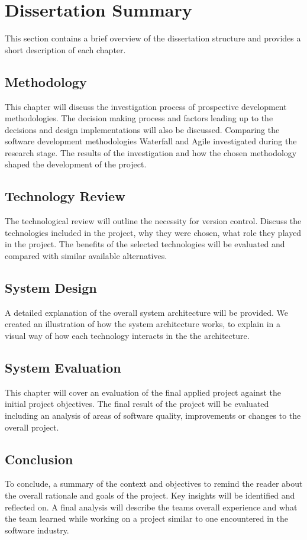 \section{Dissertation Summary}
This section contains a brief overview of the dissertation structure and provides a short description of each chapter.

\subsection{Methodology}
This chapter will discuss the investigation process of prospective development methodologies. The decision making process and factors leading up to the decisions and design implementations will also be discussed. Comparing the software development methodologies  Waterfall and Agile investigated during the research stage. The results of the investigation and how the chosen methodology shaped the development of the project. 

\subsection{Technology Review}
The technological review will outline the necessity for version control. Discuss the technologies included in the project, why they were chosen, what role they played in the project. The benefits of the selected technologies will be evaluated and compared with similar available alternatives.

\subsection{System Design}
A detailed explanation of the overall system architecture will be provided. We created an illustration of how the system architecture works, to explain in a visual way of how each technology interacts in the the architecture.

\subsection{System Evaluation}
This chapter will cover an evaluation of the final applied project against the initial project objectives. The final result of the project will be evaluated including an analysis of areas of software quality, improvements or changes to the overall project.

\subsection{Conclusion}
To conclude, a summary of the context and objectives to remind the reader about the overall rationale and goals of the project. Key insights will be identified and reflected on. A final analysis will describe the teams overall experience and what the team learned while working on a project similar to one encountered in the software industry.

